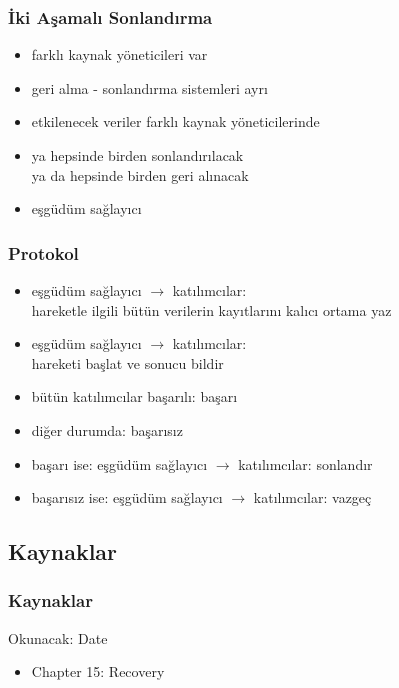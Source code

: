 \documentclass[dvipsnames]{beamer}
\theoremstyle{plain}
\begin{document}
\begin{frame}
  \frametitle{İki Aşamalı Sonlandırma}

  \begin{itemize}
    \item farklı kaynak yöneticileri var
    \item geri alma - sonlandırma sistemleri ayrı

    \medskip
    \item etkilenecek veriler farklı kaynak yöneticilerinde
    \item ya hepsinde birden sonlandırılacak\\
        ya da hepsinde birden geri alınacak

    \medskip
    \item eşgüdüm sağlayıcı
  \end{itemize}
\end{frame}

\begin{frame}
  \frametitle{Protokol}

  \begin{itemize}
    \item eşgüdüm sağlayıcı $\rightarrow$ katılımcılar: \\
      hareketle ilgili bütün verilerin kayıtlarını kalıcı ortama yaz

    \pause
    \item eşgüdüm sağlayıcı $\rightarrow$ katılımcılar: \\
      hareketi başlat ve sonucu bildir
    
    \pause
    \medskip
    \item bütün katılımcılar başarılı: başarı
    \item diğer durumda: başarısız    
    
    \medskip    
    \item başarı ise: eşgüdüm sağlayıcı $\rightarrow$ katılımcılar: sonlandır
    \item  başarısız ise: eşgüdüm sağlayıcı $\rightarrow$ katılımcılar: vazgeç
  \end{itemize}
\end{frame}

\subsection*{Kaynaklar}

\begin{frame}
  \frametitle{Kaynaklar}

  \begin{block}{Okunacak: Date}
    \begin{itemize}
      \item Chapter 15: \alert{Recovery}
    \end{itemize}
  \end{block}
\end{frame}
\end{document}
